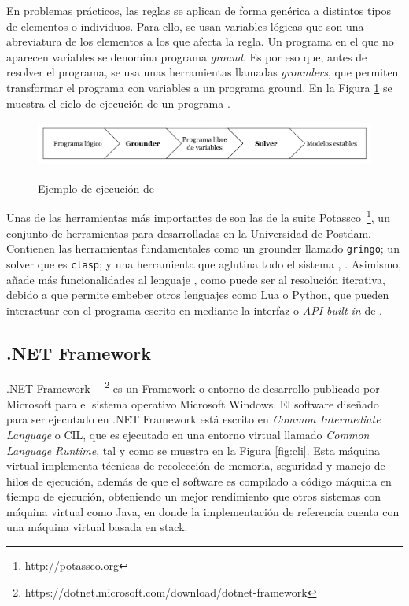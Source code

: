En problemas prácticos, las reglas se aplican de forma genérica a distintos tipos de elementos o individuos. Para ello, se usan variables lógicas que son una abreviatura de los elementos a los que afecta la regla. Un programa en el que no aparecen variables se denomina programa \emph{ground}. Es por eso que, antes de resolver el programa, se usa unas herramientas llamadas \textit{grounders}, que permiten transformar el programa con variables a un programa ground. En la Figura \ref{fig:asp} se muestra el ciclo de ejecución de un programa \asp. \\

\begin{figure}[h]
	\centering
	\includegraphics[height=4em]{images/ejecucion-asp}
	\label{fig:asp}
	\caption{Ejemplo de ejecución de \asp}
\end{figure}

Unas de las herramientas más importantes de \asp son las de la suite Potassco~\footnote{http://potassco.org}, un conjunto de herramientas para \asp desarrolladas en la Universidad de Postdam. Contienen las herramientas fundamentales como un grounder llamado \texttt{gringo}; un solver que es \texttt{clasp}; y una herramienta que aglutina todo el sistema \asp, \clingo. Asimismo, añade más funcionalidades al lenguaje \asp, como puede ser al resolución iterativa, debido a que permite embeber otros lenguajes como Lua o Python, que pueden interactuar con el programa escrito en \asp mediante la interfaz o \textit{API built-in} de \clingo.

\subsection{.NET Framework}

.NET Framework~~ \footnote{https://dotnet.microsoft.com/download/dotnet-framework} es un Framework o entorno de desarrollo publicado por Microsoft para el sistema operativo Microsoft Windows. El software diseñado para ser ejecutado en .NET Framework está escrito en \textit{Common Intermediate Language} o CIL, que es ejecutado en una entorno virtual llamado \textit{Common Language Runtime}, tal y como se muestra en la Figura \ref{fig:cli}. Esta máquina virtual implementa técnicas de recolección de memoria, seguridad y manejo de hilos de ejecución, además de que el software es compilado a código máquina en tiempo de ejecución, obteniendo un mejor rendimiento que otros sistemas con máquina virtual como Java, en donde la implementación de referencia cuenta con una máquina virtual basada en stack. \\

